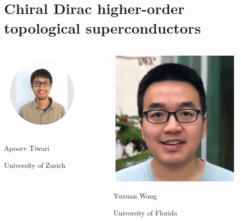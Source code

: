 \documentclass{beamer}
\renewcommand{\(}{\left(}
\renewcommand{\)}{\right)}
\renewcommand{\[}{\left[}
\renewcommand{\]}{\right]}
\begin{document}
\section{Chiral Dirac higher-order topological superconductors}
\begin{frame}
    \centering
    \begin{columns}
        \begin{column}{0.5\textwidth}
            \centering
            \includegraphics[trim= 0 20 0 20,clip]{Screenshot_20200516_213116.png}

            Apoorv Tiwari
            
            University of Zurich
        \end{column}
        \begin{column}{0.5\textwidth}
            \centering
            \includegraphics[scale=0.4]{YWSC.png}

            Yuxuan Wang 

            University of Florida
        \end{column}
    \end{columns}
\end{frame}
\end{document}
